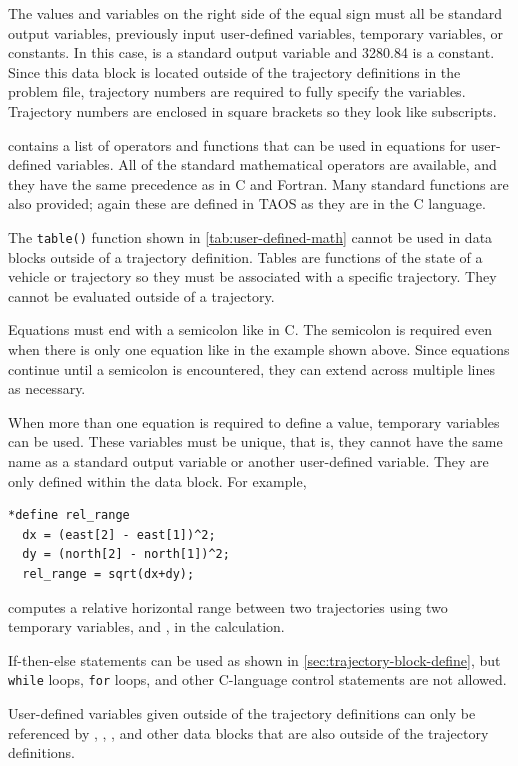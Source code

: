 The values and variables on the right side of the equal sign must all be standard
output variables, previously input user-defined variables, temporary variables, or
constants. In this case,  is a standard output variable and 3280.84 is a
constant. Since this data block is located outside of the trajectory definitions in the
problem file, trajectory numbers are required to fully specify the variables.
Trajectory numbers are enclosed in square brackets so they look like subscripts.

 contains a list of operators and
functions that can be used in equations for user-defined variables. All of the standard
mathematical operators are available, and they have the same precedence as in C and
Fortran. Many standard functions are also provided; again these are defined in TAOS
as they are in the C language.

The \texttt{table()} function shown in \cref{tab:user-defined-math}
cannot be used in  data blocks outside of a trajectory
definition. Tables are functions of the state of a vehicle or trajectory so they must be
associated with a specific trajectory. They cannot be evaluated outside of a
trajectory.

Equations must end with a semicolon like in C. The semicolon is required even when
there is only one equation like in the example shown above. Since equations continue
until a semicolon is encountered, they can extend across multiple lines as necessary.

When more than one equation is required to define a value, temporary variables can
be used. These variables must be unique, that is, they cannot have the same name as
a standard output variable or another user-defined variable. They are only defined
within the  data block. For example,

\begin{lstlisting}[style=taosmanual]
*define rel_range
  dx = (east[2] - east[1])^2;
  dy = (north[2] - north[1])^2;
  rel_range = sqrt(dx+dy);
\end{lstlisting}

computes a relative horizontal range between two trajectories using two temporary
variables,  and , in the calculation.

If-then-else statements can be used as shown in
\cref{sec:trajectory-block-define}, but \texttt{while} loops, \texttt{for} loops,
and other C-language control statements are not allowed.

User-defined variables given outside of the trajectory definitions can only be
referenced by , ,
, and other  data blocks that are also
outside of the trajectory definitions.
